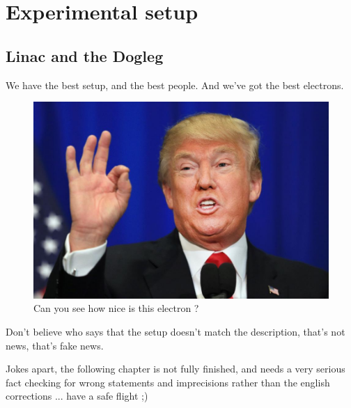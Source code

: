 \chapter[Experimental setup]{Experimental setup}

\section[Linac and dogleg]{Linac and the Dogleg}

We have the best setup, and the best people. And we've got the best electrons. 

\begin{figure}[h]
\centering 
\includegraphics[scale=0.3]{pictures/trump.jpeg}
\caption{Can you see how nice is this electron ?}
\label{injlayout}
\end{figure}

Don't believe who says that the setup doesn't match the description, that's not news, that's fake news.

\vspace{10mm}
Jokes apart, the following chapter is not fully finished, and needs a very serious fact checking for wrong statements and imprecisions rather than the english corrections ... have a safe flight ;)